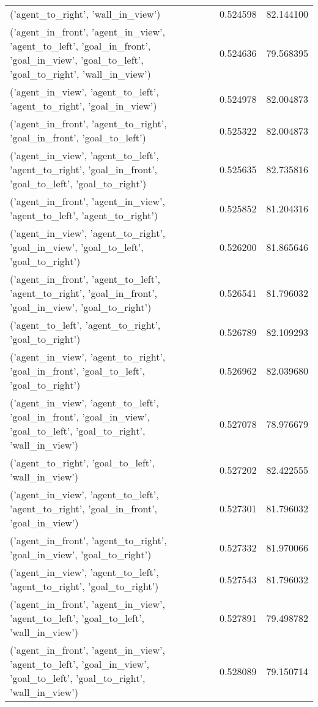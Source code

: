 \begin{tabular}{lrr}
('agent\_to\_right', 'wall\_in\_view') & 0.524598 & 82.144100 \\
('agent\_in\_front', 'agent\_in\_view', 'agent\_to\_left', 'goal\_in\_front', 'goal\_in\_view', 'goal\_to\_left', 'goal\_to\_right', 'wall\_in\_view') & 0.524636 & 79.568395 \\
('agent\_in\_view', 'agent\_to\_left', 'agent\_to\_right', 'goal\_in\_view') & 0.524978 & 82.004873 \\
('agent\_in\_front', 'agent\_to\_right', 'goal\_in\_front', 'goal\_to\_left') & 0.525322 & 82.004873 \\
('agent\_in\_view', 'agent\_to\_left', 'agent\_to\_right', 'goal\_in\_front', 'goal\_to\_left', 'goal\_to\_right') & 0.525635 & 82.735816 \\
('agent\_in\_front', 'agent\_in\_view', 'agent\_to\_left', 'agent\_to\_right') & 0.525852 & 81.204316 \\
('agent\_in\_view', 'agent\_to\_right', 'goal\_in\_view', 'goal\_to\_left', 'goal\_to\_right') & 0.526200 & 81.865646 \\
('agent\_in\_front', 'agent\_to\_left', 'agent\_to\_right', 'goal\_in\_front', 'goal\_in\_view', 'goal\_to\_right') & 0.526541 & 81.796032 \\
('agent\_to\_left', 'agent\_to\_right', 'goal\_to\_right') & 0.526789 & 82.109293 \\
('agent\_in\_view', 'agent\_to\_right', 'goal\_in\_front', 'goal\_to\_left', 'goal\_to\_right') & 0.526962 & 82.039680 \\
('agent\_in\_view', 'agent\_to\_left', 'goal\_in\_front', 'goal\_in\_view', 'goal\_to\_left', 'goal\_to\_right', 'wall\_in\_view') & 0.527078 & 78.976679 \\
('agent\_to\_right', 'goal\_to\_left', 'wall\_in\_view') & 0.527202 & 82.422555 \\
('agent\_in\_view', 'agent\_to\_left', 'agent\_to\_right', 'goal\_in\_front', 'goal\_in\_view') & 0.527301 & 81.796032 \\
('agent\_in\_front', 'agent\_to\_right', 'goal\_in\_view', 'goal\_to\_right') & 0.527332 & 81.970066 \\
('agent\_in\_view', 'agent\_to\_left', 'agent\_to\_right', 'goal\_to\_right') & 0.527543 & 81.796032 \\
('agent\_in\_front', 'agent\_in\_view', 'agent\_to\_left', 'goal\_to\_left', 'wall\_in\_view') & 0.527891 & 79.498782 \\
('agent\_in\_front', 'agent\_in\_view', 'agent\_to\_left', 'goal\_in\_view', 'goal\_to\_left', 'goal\_to\_right', 'wall\_in\_view') & 0.528089 & 79.150714 \\

\end{tabular}
